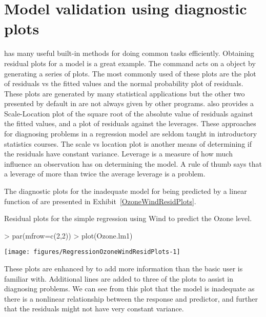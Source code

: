 \section{Model validation using diagnostic plots} 
\label{RegValid}  
 
\R{} has many useful built-in methods for doing common tasks efficiently. Obtaining residual plots for a model is a great example. The  command acts on a  object by generating a series of plots. The most commonly used of these plots are the plot of residuals vs the fitted values and the normal probability plot of residuals. These plots are generated by many statistical applications but the other two presented by default in \R{} are not always given by other programs. 
\R{} also provides a Scale-Location plot of the square root of the absolute value of residuals against the fitted values, and a plot of residuals against the leverages. These approaches for diagnosing problems in a regression model are seldom taught in introductory statistics courses.  
The scale vs location plot is another means of determining if the residuals have constant variance. Leverage is a measure of how much influence an observation has on determining the model. A rule of thumb says that a leverage of more than twice the average leverage is a problem. 
 
The diagnostic plots for the inadequate model for  being predicted by a linear function of  are presented in Exhibit~\ref{OzoneWindResidPlots}. 
\begin{exhibit} 
\begin{center} 
\caption{Residual plots for the simple regression using Wind to predict the Ozone level.} 
\label{OzoneWindResidPlots} 

\begin{Schunk}
\begin{Sinput}
> par(mfrow=c(2,2)) 
> plot(Ozone.lm1) 
\end{Sinput}

\texttt{[image: figures/RegressionOzoneWindResidPlots-1]} \end{Schunk}

\end{center} 
\end{exhibit} 
These plots are enhanced by \R{} to add more information than the basic user is familiar with. Additional lines are added to three of the plots to assist in diagnosing problems. We can see from this plot that the model is inadequate as there is a nonlinear relationship between the response and predictor, and further that the residuals might not have very constant variance. 
 
